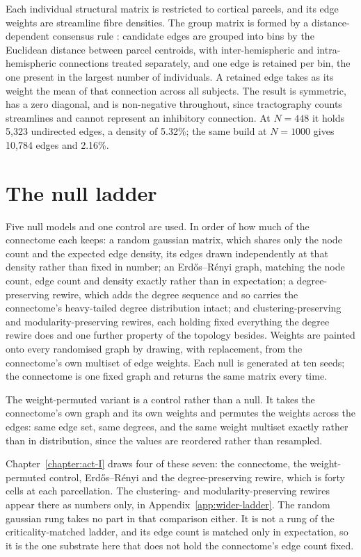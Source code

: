 Each individual structural matrix is restricted to cortical parcels, and its
edge weights are streamline fibre densities. The group matrix is formed by a
distance-dependent consensus rule \cite{betzel2019distance}: candidate edges are
grouped into bins by the Euclidean distance between parcel centroids, with
inter-hemispheric and intra-hemispheric connections treated separately, and one
edge is retained per bin, the one present in the largest number of individuals.
A retained edge takes as its weight the mean of that connection across all
subjects. The result is symmetric, has a zero diagonal, and is non-negative
throughout, since tractography counts streamlines and cannot represent an
inhibitory connection. At $N = 448$ it holds
5{,}323 %
undirected edges, a density of 5.32\%; %
the same build at $N = 1000$ gives
10{,}784 %
edges and 2.16\%. %

\section{The null ladder}
\label{sec:methods-ladder}
\bigskip

Five null models and one control are used. In order of how much of the
connectome each keeps: 
a random gaussian matrix, which shares only the node count and the expected edge
density, its edges drawn independently at that density rather than fixed in
number; an Erdős–Rényi graph, matching the node
count, edge count and density exactly rather than in expectation; a
degree-preserving rewire, which adds the degree sequence and so carries the
connectome's heavy-tailed degree distribution intact; and
clustering-preserving and modularity-preserving rewires, each holding fixed
everything the degree rewire does and one further property of the topology
besides. Weights are painted onto every randomised graph by drawing, with
replacement, from the connectome's own multiset of edge
weights. %
Each null is generated at ten seeds; %
the connectome is one fixed graph and returns the same matrix every time.

The weight-permuted variant is a control rather than a null. It takes the
connectome's own graph and its own weights and permutes the weights across the
edges: same edge set, same degrees, and the same weight multiset exactly rather
than in distribution, since the values are reordered rather than
resampled. %

Chapter~\ref{chapter:act-I} draws four of these seven: the connectome, the
weight-permuted control, Erdős–Rényi and the degree-preserving rewire, which is
forty cells at each parcellation. The clustering- and modularity-preserving
rewires appear there as numbers only, in Appendix~\ref{app:wider-ladder}. 
The random gaussian rung takes no part in that comparison either. It is not a
rung of the criticality-matched ladder, and its edge count is matched only in
expectation, so it is the one substrate here that does not hold the connectome's
edge count fixed.

